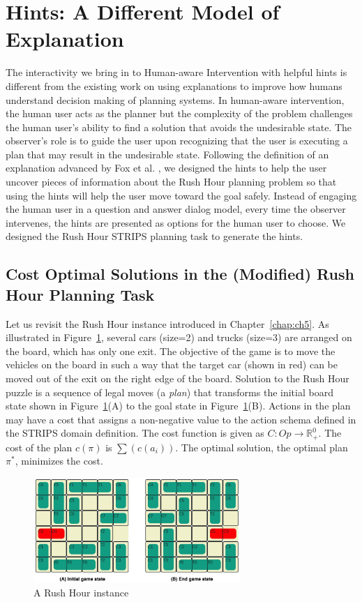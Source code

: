 \section{Hints: A Different Model of Explanation}
The interactivity we bring in to Human-aware Intervention with helpful hints is different from the existing work on using explanations to improve how humans understand decision making of planning systems.
In human-aware intervention, the human user acts as the planner but the complexity of the problem challenges the human user's ability to find a solution that avoids the undesirable state.
The observer's role is to guide the user upon recognizing that the user is executing a plan that may result in the undesirable state.
Following the definition of an explanation advanced by Fox et al. \citeyear{fox2017xai}, we designed the hints to help the user uncover pieces of information about the Rush Hour planning problem so that using the hints will help the user move toward the goal safely.
Instead of engaging the human user in a question and answer dialog model, every time the observer intervenes, the hints are presented as options for the human user to choose.
We designed the Rush Hour STRIPS planning task to generate the hints.

\subsection{Cost Optimal Solutions in the (Modified) Rush Hour Planning Task}
\label{sec:costoptimal}
Let us revisit the Rush Hour instance introduced in Chapter~\ref{chap:ch5}. As illustrated in Figure~\ref{fig:board}, several cars (size=2) and trucks (size=3) are arranged on the board, which has only one exit.
The objective of the game is to move the vehicles on the board in such a way that the target car (shown in red) can be moved out of the exit on the right edge of the board. Solution to the Rush Hour puzzle is a sequence of legal moves (a \textit{plan}) that transforms the initial board state shown in Figure~\ref{fig:board}(A) to the goal state in Figure~\ref{fig:board}(B). 
Actions in the plan may have a cost that assigns a non-negative value to the action schema defined in the STRIPS domain definition. 
The cost function is given as $C: Op \rightarrow \mathbb{R}^0_+$. 
The cost of the plan $c(\pi)$ is  $\sum(c(a_i))$. The optimal solution, the optimal plan $\pi^*$, minimizes the cost. 

\begin{figure}[tpb]
  \centering
    	\includegraphics[width=0.7\textwidth]{img/figure4.jpg}
    	\caption{A Rush Hour instance}
    	\label{fig:board}
\end{figure}

